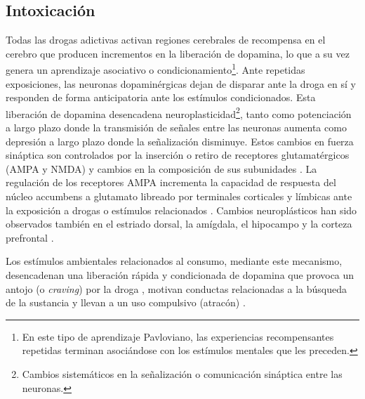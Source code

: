 \subsection{Intoxicación}
\label{intox}
Todas las drogas adictivas activan regiones cerebrales de recompensa en el cerebro que producen incrementos en la liberación de dopamina, lo que a su vez genera un aprendizaje asociativo o condicionamiento\footnote{En este tipo de aprendizaje Pavloviano, las experiencias recompensantes repetidas terminan asociándose con los estímulos mentales que les preceden.}.
Ante repetidas exposiciones, las neuronas dopaminérgicas dejan de disparar ante la droga en sí y responden de forma anticipatoria ante los estímulos condicionados. Esta liberación de dopamina desencadena neuroplasticidad\footnote{Cambios sistemáticos en la señalización o comunicación sináptica entre las neuronas.}, tanto como potenciación a largo plazo \textemdash donde la transmisión de señales entre las neuronas aumenta\textemdash{} como depresión a largo plazo \textemdash donde la señalización disminuye. Estos cambios en fuerza sináptica son controlados por la inserción o retiro de receptores glutamatérgicos (AMPA y NMDA) y cambios en la composición de sus subunidades \parencite{Volkow2016}. La regulación de los receptores AMPA incrementa la capacidad de respuesta del núcleo accumbens a glutamato libreado por terminales corticales y límbicas ante la exposición a drogas o estímulos relacionados \parencite{Wolf2010}. Cambios neuroplásticos han sido observados también en el estriado dorsal, la amígdala, el hipocampo y la corteza prefrontal \parencite{Volkow2016}.\par
Los estímulos ambientales relacionados al consumo, mediante este mecanismo, desencadenan una liberación rápida y condicionada de dopamina que provoca un antojo (o \textit{craving}) por la droga \parencite{Volkow2006}, motivan conductas relacionadas a la búsqueda de la sustancia y llevan a un uso compulsivo (atracón) \parencite{Volkow2016}.

